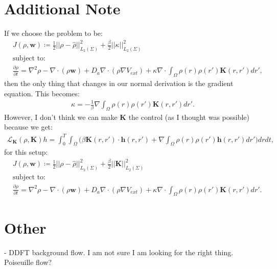 \documentclass[11pt, a4paper]{article}
\theoremstyle{definition}
\newcommand{\w}{\mathbf{w}}
\newcommand{\h}{\mathbf{h}}
\newcommand{\K}{\mathbf{K}}
\begin{document}
	\section*{Additional Note}
	If we choose the problem to be: 
	\begin{align*}
	&J(\rho, \w) \coloneqq \frac{1}{2}|| \rho - \widehat{\rho} ||^2_{L_2(\Sigma)} + \frac{\beta}{2}||\kappa||^2_{L_2(\Sigma)}\\
	&\text{subject to:}\\
	&\frac{\partial \rho}{\partial t} = \nabla^2 \rho - \nabla \cdot(\rho \w) + D_a \nabla \cdot (\rho \nabla V_{ext}) + \kappa \nabla \cdot \int_\Omega \rho(r) \rho (r') \K(r,r')dr', 
	\end{align*}
	then the only thing that changes in our normal derivation is the gradient equation. This becomes:
	\begin{align*}
	\kappa = - \frac{1}{\beta} \nabla \int_\Omega \rho(r) \rho(r') \K(r,r') dr'.
	\end{align*}
	However, I don't think we can make $\K$ the control (as I thought was possible) because we get:
	\begin{align*}
	\mathcal{L}_{\K}(\rho, \K)h = \int_0^T \int_\Omega \bigg( \beta \K(r,r') \cdot \h(r,r')  + \nabla \int_\Omega \rho(r) \rho(r') \h(r,r') dr' \bigg) dr dt,
	\end{align*}
	for this setup:
	\begin{align*}
	&J(\rho, \w) \coloneqq \frac{1}{2}|| \rho - \widehat{\rho} ||^2_{L_2(\Sigma)} + \frac{\beta}{2}||\K||^2_{L_2(\Sigma)}\\
	&\text{subject to:}\\
	&\frac{\partial \rho}{\partial t} = \nabla^2 \rho - \nabla \cdot(\rho \w) + D_a \nabla \cdot (\rho \nabla V_{ext}) + \kappa \nabla \cdot \int_\Omega \rho(r) \rho (r') \K(r,r')dr'.
	\end{align*}
	
\section*{Other}
- DDFT background flow. I am not sure I am looking for the right thing. Poiseuille 
flow?	
	
	
	
	
	
	
	
\end{document}
